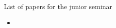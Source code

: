 \documentclass[A4paper, 12pt]{article}
\begin{document}
\begin{center}
  {\huge List of papers for the junior seminar}
\end{center}

\begin{itemize}
  \item
\end{itemize}
\end{document}

